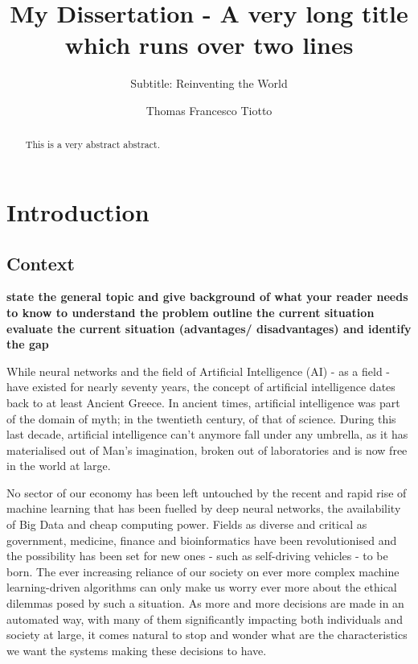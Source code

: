 \documentclass[mscthesis]{usiinfthesis}
\title{My Dissertation - A very long title\\ which runs over two
  lines} %
\subtitle{Subtitle: Reinventing the World} %
\author{Thomas Francesco Tiotto} %
\begin{document}
\maketitle %

\frontmatter %

\begin{abstract}
This is a very abstract abstract. 

\lipsum
\end{abstract}

\begin{acknowledgements}
\lipsum 
\end{acknowledgements}

\tableofcontents 
\listoffigures %
\listoftables %

\mainmatter

\chapter{Introduction}
\section{Context}
\textbf{state the general topic and give background of what your reader needs to know to understand the problem outline the current situation evaluate the current situation (advantages/ disadvantages) and identify the gap}

While neural networks and the field of Artificial Intelligence (AI) - as a field - have existed for nearly seventy years, the concept of artificial intelligence dates back to at least Ancient Greece.  In ancient times, artificial intelligence was part of the domain of myth; in the twentieth century, of that of science.  During this last decade, artificial intelligence can't anymore fall under any umbrella, as it has materialised out of Man's imagination, broken out of laboratories and is now free in the world at large.

No sector of our economy has been left untouched by the recent and rapid rise of machine learning that has been fuelled by deep neural networks, the availability of Big Data and cheap computing power.  Fields as diverse and critical as government, medicine, finance and bioinformatics have been revolutionised and the possibility has been set for new ones - such as self-driving vehicles - to be born.  
The ever increasing reliance of our society on ever more complex machine learning-driven algorithms can only make us worry ever more about the ethical dilemmas posed by such a situation.  
As more and more decisions are made in an automated way, with many of them significantly impacting both individuals and society at large, it comes natural to stop and wonder what are the characteristics we want the systems making these decisions to have.  
\end{document}
